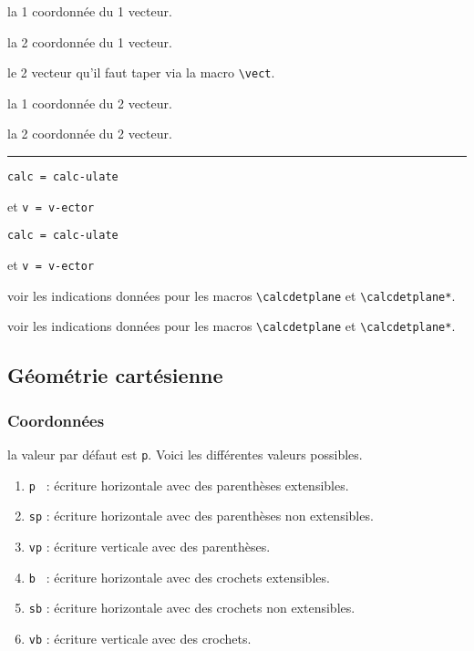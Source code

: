 \documentclass[12pt,a4paper]{article}
\newcommand\env[1]{\texttt{#1}}
\newcommand\macro[1]{\env{\textbackslash{}#1}}
\theoremstyle{definition}
\newcommand\separation{
	\medskip
	\hfill\rule{0.5\textwidth}{0.75pt}\hfill
	\medskip
}
\newcommand\mwhyprefix[2]{%
	\texttt{#1 = #1-#2}%
}
\begin{document}
 la 1\iere{} coordonnée du 1\ier{} vecteur.

 la 2\ieme{} coordonnée du 1\ier{} vecteur.

 le 2\ieme{} vecteur qu'il faut taper via la macro \macro{vect}.

 la 1\iere{} coordonnée du 2\ieme{} vecteur.

 la 2\ieme{} coordonnée du 2\ieme{} vecteur.


\separation


 \hfill \mwhyprefix{calc}{ulate}
                                   et \mwhyprefix{v}{ector}

 \hfill \mwhyprefix{calc}{ulate}
                                   et \mwhyprefix{v}{ector}


\IDoption{} voir les indications données pour les macros \macro{calcdetplane} et \macro{calcdetplane*}.

 voir les indications données pour les macros \macro{calcdetplane} et \macro{calcdetplane*}.


\subsection{Géométrie cartésienne}

\subsubsection{Coordonnées} \label{tnsgeo-coordinates}



\label{tnsgeo-coordinates-tech}



\IDoption{} la valeur par défaut est \verb+p+. Voici les différentes valeurs possibles.
\begin{enumerate}
	\item \verb+p + : écriture horizontale avec des parenthèses extensibles.

	\item \verb+sp+ : écriture horizontale avec des parenthèses non extensibles.

	\item \verb+vp+ : écriture verticale avec des parenthèses.

	\item \verb+b + : écriture horizontale avec des crochets extensibles.

	\item \verb+sb+ : écriture horizontale avec des crochets non extensibles.

	\item \verb+vb+ : écriture verticale avec des crochets.
\end{enumerate}
\end{document}
